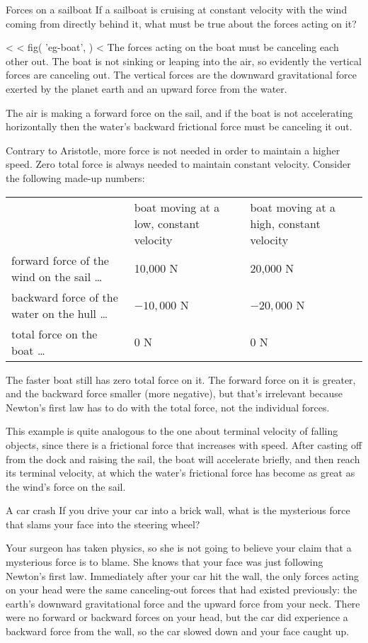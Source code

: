 \begin{eg}{Forces on a sailboat }\label{eg:boat}
\egquestion If a sailboat is cruising at constant velocity
with the wind coming from directly behind it, what must be
true about the forces acting on it?

<%
<%
  fig(
    'eg-boat',
  )
<%
\eganswer The forces acting on the boat must be canceling each
other out. The boat is not sinking or leaping into the air,
so evidently the vertical forces are canceling out. The
vertical forces are the downward gravitational force exerted
by the planet earth and an upward force from the water.

    The air is making a forward force on the sail, and if the
boat is not accelerating horizontally then the water's
backward frictional force must be canceling it out.

    Contrary to Aristotle, more force is not needed in order to
maintain a higher speed. Zero total force is always needed
to maintain constant velocity. Consider the following made-up numbers:

\begin{tabular}{p{30mm}p{27mm}p{27mm}}
     & boat moving at a low, constant velocity & boat moving at a high, constant velocity \\
forward force of the wind on the sail \ldots & 10,000 N & 20,000 N \\
backward force of the water on the hull \ldots & $-10,000$ N & $-20,000$ N\\
total force on the boat \ldots & 0 N & 0 N
\end{tabular}

\noindent The faster boat still has zero total force on it. The
forward force on it is greater, and the backward force
smaller (more negative), but that's irrelevant because
Newton's first law has to do with the total force, not
the individual forces.

    This example is quite analogous to the one about terminal
velocity of falling objects, since there is a frictional
force that increases with speed. After casting off from the
dock and raising the sail, the boat will accelerate briefly,
and then reach its terminal velocity, at which the water's
frictional force has become as great as the wind's force on the sail.
\end{eg}

\begin{eg}{A car crash}
\egquestion If you drive your car into a brick wall, what is
the mysterious force that slams your face into the steering wheel?

\eganswer Your surgeon has taken physics, so she is not going
to believe your claim that a mysterious force is to blame.
She knows that your face was just following Newton's first
law. Immediately after your car hit the wall, the only
forces acting on your head were the same canceling-out
forces that had existed previously: the earth's downward
gravitational force and the upward force from your neck.
There were no forward or backward forces on your head, but
the car did experience a backward force from the wall, so
the car slowed down and your face caught up.
\end{eg}


